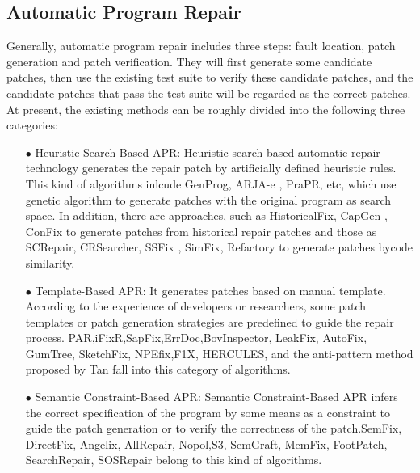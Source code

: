 \subsection{Automatic Program Repair}
\label{2.1}
Generally, automatic program repair includes three steps: fault location, patch generation and patch verification. They will first generate some candidate patches, then use the existing test suite to verify these candidate patches, and the candidate patches that pass the test suite will be regarded as the correct patches. At present, the existing methods can be roughly divided into the following three categories: 

\begin{itemize}
	\item[$\bullet$] Heuristic Search-Based APR: Heuristic search-based automatic repair technology generates the repair patch by artificially defined heuristic rules. This kind of algorithms inlcude GenProg, ARJA-e \cite{ref12,ref13,ref14,ref15}, PraPR\cite{ref16}, etc, which use genetic algorithm to generate patches with the original program as search space. In addition, there are approaches, such as HistoricalFix\cite{ref17}, CapGen \cite{ref18}, ConFix\cite{ref19} to generate patches from historical repair patches and those as SCRepair\cite{ref20}, CRSearcher\cite{ref21}, SSFix \cite{ref22}, SimFix\cite{ref23}, Refactory\cite{ref24} to generate patches bycode similarity.
	\item[$\bullet$] Template-Based APR: It generates patches based on manual template. According to the experience of developers or researchers, some patch templates or patch generation strategies are predefined to guide the repair process. PAR\cite{ref25},iFixR\cite{ref26},SapFix\cite{ref27},ErrDoc\cite{ref28},BovInspector\cite{ref29}, LeakFix\cite{ref30}, AutoFix\cite{ref31}, GumTree\cite{ref32}, SketchFix\cite{ref33}, NPEfix\cite{ref34},F1X\cite{ref35}, HERCULES\cite{ref36}, and the anti-pattern method proposed by Tan\cite{ref37} fall into this category of algorithms.
	\item[$\bullet$] Semantic Constraint-Based APR: Semantic Constraint-Based APR infers the correct specification of the program by some means as a constraint to guide the patch generation or to verify the correctness of the patch.SemFix\cite{ref38}, DirectFix\cite{ref39}, Angelix\cite{ref40}, AllRepair\cite{ref41}, Nopol,S3\cite{ref42}, SemGraft\cite{ref43}, MemFix\cite{ref44}, FootPatch\cite{ref45}, SearchRepair\cite{ref46}, SOSRepair\cite{ref47} belong to this kind of algorithms.
\end{itemize}

